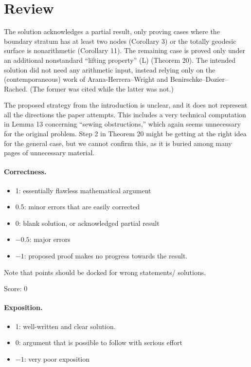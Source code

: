 \documentclass[11pt]{article}
\theoremstyle{remark}
\begin{document}
\maketitle

\section{Review}
The solution acknowledges a partial result, only proving cases where the boundary stratum has at least two nodes (Corollary 3) or the totally geodesic surface is nonarithmetic (Corollary 11).
The remaining case is proved only under an additional nonstandard ``lifting property'' (L) (Theorem 20).
The intended solution did not need any arithmetic input, instead relying only on the (contemporaneous) work of Arana-Herrera--Wright and Benirschke--Dozier--Rached.
(The former was cited while the latter was not.)

The proposed strategy from the introduction is unclear, and it does not represent all the directions the paper attempts.
This includes a very technical computation in Lemma 13 concerning ``sewing obstructions,'' which again seems unnecessary for the original problem.
Step 2 in Theorem 20 might be getting at the right idea for the general case, but we cannot confirm this, as it is buried among many pages of unnecessary material.

\paragraph{Correctness.}
\begin{itemize}
	\item  1: essentially flawless mathematical argument
	\item  0.5: minor errors that are easily corrected
	\item  0: blank solution, or acknowledged partial result
	\item  $-0.5$: major errors
	\item  $-1$: proposed proof makes no progress towards the result.
\end{itemize}
Note that points should be docked for wrong statements/ solutions.

\noindent Score: 0

\paragraph{Exposition.}
\begin{itemize}
	\item  1: well-written and clear solution.
	\item  0: argument that is possible to follow with serious effort
	\item  $-1$: very poor exposition
\end{itemize}
\end{document}
